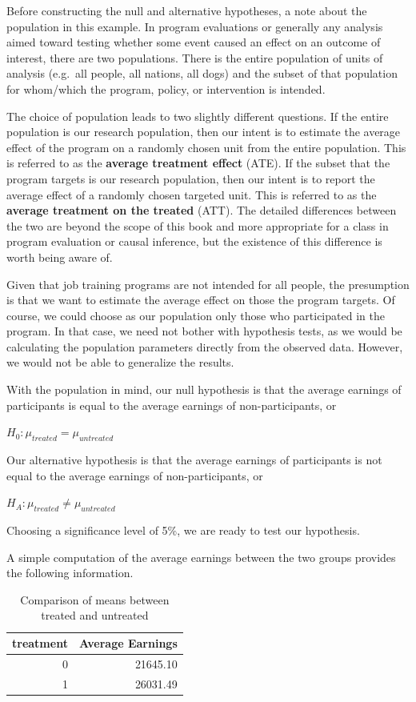 \documentclass[
]{book}
\begin{document}
Before constructing the null and alternative hypotheses, a note about the population in this example. In program evaluations or generally any analysis aimed toward testing whether some event caused an effect on an outcome of interest, there are two populations. There is the entire population of units of analysis (e.g.~all people, all nations, all dogs) and the subset of that population for whom/which the program, policy, or intervention is intended.

The choice of population leads to two slightly different questions. If the entire population is our research population, then our intent is to estimate the average effect of the program on a randomly chosen unit from the entire population. This is referred to as the \textbf{average treatment effect} (ATE). If the subset that the program targets is our research population, then our intent is to report the average effect of a randomly chosen targeted unit. This is referred to as the \textbf{average treatment on the treated} (ATT). The detailed differences between the two are beyond the scope of this book and more appropriate for a class in program evaluation or causal inference, but the existence of this difference is worth being aware of.

Given that job training programs are not intended for all people, the presumption is that we want to estimate the average effect on those the program targets. Of course, we could choose as our population only those who participated in the program. In that case, we need not bother with hypothesis tests, as we would be calculating the population parameters directly from the observed data. However, we would not be able to generalize the results.

With the population in mind, our null hypothesis is that the average earnings of participants is equal to the average earnings of non-participants, or

\(H_0: \mu_{treated} = \mu_{untreated}\)

Our alternative hypothesis is that the average earnings of participants is not equal to the average earnings of non-participants, or

\(H_A: \mu_{treated} \neq \mu_{untreated}\)

Choosing a significance level of 5\%, we are ready to test our hypothesis.

A simple computation of the average earnings between the two groups provides the following information.

\begin{table}

\caption{\label{tab:jobtrainsum}Comparison of means between treated and untreated}
\centering
\begin{tabular}[t]{r|r}
\hline
treatment & Average Earnings\\
\hline
0 & 21645.10\\
\hline
1 & 26031.49\\
\hline
\end{tabular}
\end{table}
\end{document}
